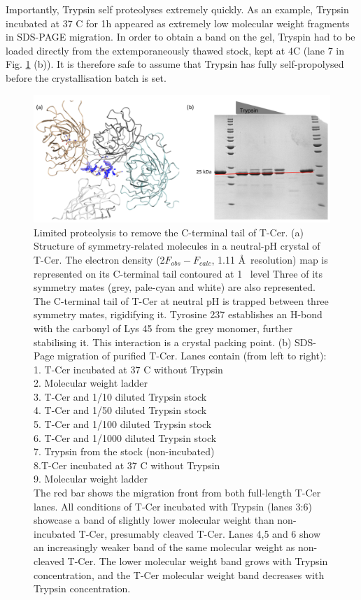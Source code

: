 Importantly, Trypsin self proteolyses extremely quickly. As an example, Trypsin incubated at 37 \degree C for 1h appeared as extremely low molecular weight fragments in SDS-PAGE migration. In order to obtain a band on the gel, Tryspin had to be loaded directly from the extemporaneously thawed stock, kept at 4\degree C  (lane 7 in Fig. \ref{fig:limited_proteolysis} (b)). It is therefore safe to assume that Trypsin has fully self-propolysed before the crystallisation batch is set. 
\begin{figure}[H] %
    \centering
        \noindent \includegraphics[width=\textwidth]{images/T-Cer/Limited_proteolysis.pdf}
    \hfill
    \caption{Limited proteolysis to remove the C-terminal tail of T-Cer. (a) Structure of symmetry-related molecules in a neutral-pH crystal of T-Cer. The electron density (2\(F_{obs} - F_{calc}\), 1.11 \AA\  resolution) map is represented on its C-terminal tail contoured at 1 \textsigma\ level Three of its symmetry mates (grey, pale-cyan and white) are also represented. The C-terminal tail of T-Cer at neutral pH is trapped between three symmetry mates, rigidifying it. Tyrosine 237 establishes an H-bond with the carbonyl of Lys 45 from the grey monomer, further stabilising it. This interaction is  a crystal packing point. (b) SDS-Page migration of purified T-Cer. Lanes contain (from left to right):\\
    1. T-Cer incubated at 37 \degree C without Trypsin\\
    2. Molecular weight ladder\\
    3. T-Cer and 1/10 diluted Trypsin stock\\
    4. T-Cer and 1/50 diluted Trypsin stock\\
    5. T-Cer and 1/100 diluted Trypsin stock\\
    6. T-Cer and 1/1000 diluted Trypsin stock\\
    7. Trypsin from the stock (non-incubated)\\
    8.T-Cer incubated at 37 \degree C without Trypsin\\
    9. Molecular weight ladder\\
    The red bar shows the migration front from both full-length T-Cer lanes. All conditions of T-Cer incubated with Trypsin (lanes 3:6) showcase a band of slightly lower molecular weight than non-incubated T-Cer, presumably cleaved T-Cer. Lanes  4,5 and 6 show an increasingly weaker band of the same molecular weight as non-cleaved T-Cer. The lower molecular weight band grows with Trypsin concentration, and the T-Cer molecular weight band decreases with Trypsin concentration.}\label{fig:limited_proteolysis}
\end{figure}
